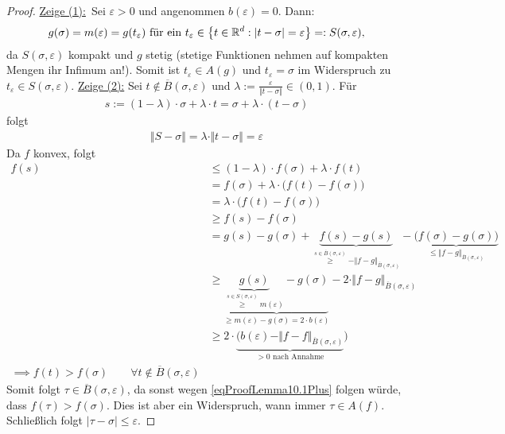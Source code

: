 \begin{proof}
	\underline{Zeige (1):}\
		Sei $\varepsilon>0$ und angenommen $b(\varepsilon)=0$.
		Dann:
		\begin{align*}
			g(\sigma)=m(\varepsilon)=g(t_\varepsilon)
			\text{ für ein }t_\varepsilon\in
			\big\lbrace t\in\mathbb{R}^d:|t-\sigma|=\varepsilon\big\rbrace=:S(\sigma,\varepsilon),
		\end{align*}
		da $S(\sigma,\varepsilon)$ kompakt und $g$ stetig (stetige Funktionen nehmen auf kompakten Mengen ihr Infimum an!).
		Somit ist $t_\varepsilon\in A(g)$ und $t_\varepsilon=\sigma$ im Widerspruch zu $t_\varepsilon\in S(\sigma,\varepsilon)$.\nl
	\underline{Zeige (2):}
	Sei $t\not\in\overline{B}(\sigma,\varepsilon)$ und $\lambda:=\frac{\varepsilon}{\Vert t-\sigma\Vert}\in(0,1)$.
	Für
	\begin{align*}
		s:=(1-\lambda)\cdot\sigma+\lambda\cdot t
		=\sigma+\lambda\cdot(t-\sigma)
	\end{align*}
	folgt
	\begin{align}\label{eqProofLemma10.1Stern}\tag{$\ast$}
		\Vert S-\sigma\Vert=\lambda\cdot\Vert t-\sigma\Vert
		=\varepsilon
	\end{align}
	Da $f$ konvex, folgt
	\begin{align}\nonumber
		f(s)
		&\leq(1-\lambda)\cdot f(\sigma)+\lambda\cdot f(t)\\\nonumber
		&=f(\sigma)+\lambda\cdot\big(f(t)-f(\sigma)\big)\\\nonumber
		&=\lambda\cdot\big(f(t)-f(\sigma)\big)\\\nonumber
		&\geq f(s)-f(\sigma)\\\nonumber
		&=g(s)-g(\sigma)+\underbrace{f(s)-g(s)}_{
			\overset{s\in\overline{B}(\sigma,\varepsilon)}{\geq}-\Vert f-g\Vert_{\overline{B}(\sigma,\varepsilon)}
		}-\underbrace{\big(f(\sigma)-g(\sigma)\big)}_{
			\leq\Vert f-g\Vert_{\overline{B}(\sigma,\varepsilon)}
		}\\\nonumber
		&\geq \underbrace{\underbrace{g(s)}_{
			\overset{s\in S(\sigma,\varepsilon)}{\geq}m(\varepsilon)
		}-g(\sigma)}_{
			\geq m(\varepsilon)-g(\sigma)=2\cdot b(\varepsilon)
		}-2\cdot\Vert f-g\Vert_{\overline{B}(\sigma,\varepsilon)}\\\nonumber
		&\geq 2\cdot\underbrace{\Big(b(\varepsilon)-\Vert f-f\Vert_{\overline{B}(\sigma,\varepsilon)}}_{
			>0\text{ nach Annahme}
		}\Big)\\
		\implies f(t)>f(\sigma)\qquad\forall t\not\in \overline{B}(\sigma,\varepsilon)\label{eqProofLemma10.1Plus}\tag{+}
	\end{align}
	Somit folgt $\tau\in\overline{B}(\sigma,\varepsilon)$, da sonst wegen \eqref{eqProofLemma10.1Plus} folgen würde, dass $f(\tau)>f(\sigma)$.
	Dies ist aber ein Widerspruch, wann immer $\tau\in A(f)$.
	Schließlich folgt $|\tau-\sigma|\leq\varepsilon$.
\end{proof}

